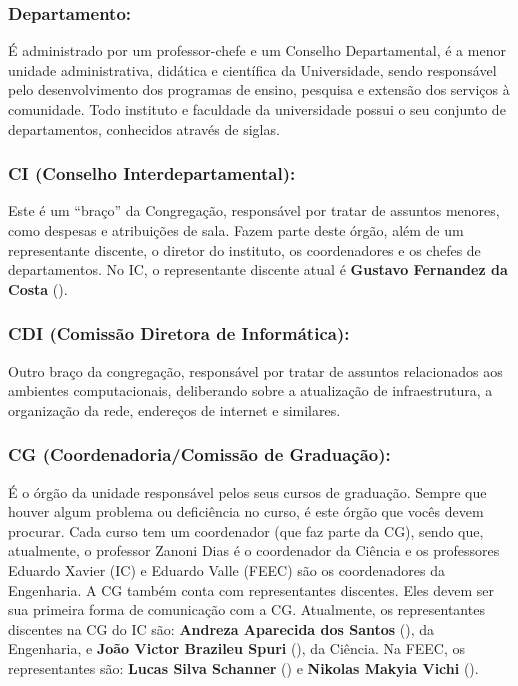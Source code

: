 \subsubsection{Departamento:} É administrado por um professor-chefe e um
Conselho Departamental, é a menor unidade administrativa, didática e científica
da Universidade, sendo responsável pelo desenvolvimento dos programas de ensino,
pesquisa e extensão dos serviços à comunidade. Todo instituto e faculdade da
universidade possui o seu conjunto de departamentos, conhecidos através de
siglas.

\subsubsection{CI (Conselho Interdepartamental):} Este é um ``braço'' da
Congregação, responsável por tratar de assuntos menores, como despesas e
atribuições de sala. Fazem parte deste órgão, além de um representante discente,
o diretor do instituto, os coordenadores e os chefes de departamentos. No IC, o
representante discente atual é \textbf{Gustavo Fernandez da Costa}
().

\subsubsection{CDI (Comissão Diretora de Informática):} Outro braço da
congregação, responsável por tratar de assuntos relacionados aos ambientes
computacionais, deliberando sobre a atualização de infraestrutura, a organização
da rede, endereços de internet e similares.

\subsubsection{CG (Coordenadoria/Comissão de Graduação):} É o órgão da unidade
responsável pelos seus cursos de graduação. Sempre que houver algum problema ou
deficiência no curso, é este órgão que vocês devem procurar.  Cada curso tem um
coordenador (que faz parte da CG), sendo que, atualmente, o professor Zanoni
Dias é o coordenador da Ciência e os professores Eduardo Xavier (IC) e Eduardo
Valle (FEEC) são os coordenadores da Engenharia. A CG também conta com
representantes discentes. Eles devem ser sua primeira forma de comunicação
com a CG.  Atualmente, os representantes discentes na CG do IC são:
\textbf{Andreza Aparecida dos Santos} (), da
Engenharia, e \textbf{João Victor Brazileu Spuri}
(), da Ciência.  Na FEEC, os
representantes são: \textbf{Lucas Silva Schanner}
() e \textbf{Nikolas Makyia Vichi}
().

